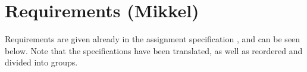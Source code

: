 \section{Requirements (Mikkel)}\label{sec:requirements}




Requirements are given already in the assignment specification \cite{case_slides}, and can be seen below. Note that the specifications have been translated, as well as reordered and divided into groups.\\

